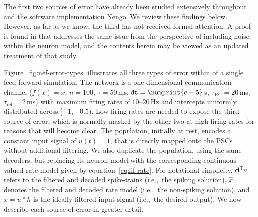 The first two sources of error have already been studied extensively throughout \citet{eliasmith2003a} and the software implementation Nengo.
We review these findings below.
However, as far as we know, the third has not received formal attention.
A proof is found in \citet[][pp.~132--136, appendix~C.1]{eliasmith2003a} that addresses the same issue from the perspective of including noise within the neuron model, and the contents herein may be viewed as an updated treatment of that study.

Figure~\ref{fig:nef-error-types} illustrates all three types of error within of a single feed-forward simulation.
The network is a one-dimensional communication channel ($f(x) = x$, $n = 100$, $\tau = 50$\,ms, $\dt{} = \numprint{e-5}$\,s, $\tau_\text{RC} = 20$\,ms, $\tau_\text{ref} = 2$\,ms) with maximum firing rates of $10$--$20$\,Hz and intercepts uniformly distributed across $[-1, -0.5)$.
Low firing rates are needed to expose the third source of error, which is normally masked by the other two at high firing rates for reasons that will become clear.
The population, initially at rest, encodes a constant input signal of $u(t) = 1$, that is directly mapped onto the PSCs without additional filtering.
We also duplicate the population, using the same decoders, but replacing its neuron model with the corresponding continuous-valued rate model given by equation~\ref{eq:lif-rate}.
For notational simplicity, ${\mathbf{d}}^\mathsf{T}a$ refers to the filtered and decoded spike-trains (i.e.,~the spiking solution), $\hat{x}$ denotes the filtered and decoded rate model (i.e.,~the non-spiking solution), and $x = u \ast h$ is the ideally filtered input signal (i.e.,~the desired output).
We now describe each source of error in greater detail.

